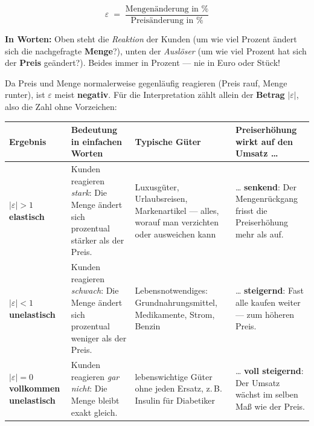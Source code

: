 \documentclass[11pt, a4paper]{article}
\begin{document}
\medskip
\noindent
\begin{minipage}[c]{0.55\textwidth}
\begin{formelbox}
\[
\varepsilon \;=\; \frac{\text{Mengenänderung in \%}}{\text{Preisänderung in \%}}
\]
\end{formelbox}
\end{minipage}\hfill
\begin{minipage}[c]{0.41\textwidth}
\small
\textbf{In Worten:} Oben steht die \emph{Reaktion} der Kunden (um wie viel Prozent
ändert sich die nachgefragte \textbf{Menge}?), unten der \emph{Auslöser} (um wie viel
Prozent hat sich der \textbf{Preis} geändert?). Beides immer in Prozent --- nie in
Euro oder Stück!
\end{minipage}
\medskip

Da Preis und Menge normalerweise gegenläufig reagieren (Preis rauf, Menge runter),
ist $\varepsilon$ meist \textbf{negativ}. Für die Interpretation zählt allein der
\textbf{Betrag} $|\varepsilon|$, also die Zahl ohne Vorzeichen:

\begin{center}
\small
\begin{tabular}{p{2.7cm} p{4.0cm} p{3.3cm} p{4.0cm}}
\toprule
\rowcolor{bfwTabHead}
\textbf{Ergebnis} & \textbf{Bedeutung in einfachen Worten} & \textbf{Typische Güter} & \textbf{Preiserhöhung wirkt auf den Umsatz \ldots}\\
\midrule
$|\varepsilon| > 1$ \newline \textbf{elastisch} &
  Kunden reagieren \emph{stark}: Die Menge ändert sich prozentual stärker als der Preis. &
  Luxusgüter, Urlaubsreisen, Markenartikel --- alles, worauf man verzichten oder ausweichen kann &
  \ldots{} \textbf{senkend}: Der Mengenrückgang frisst die Preiserhöhung mehr als auf.\\
\addlinespace
$|\varepsilon| < 1$ \newline \textbf{unelastisch} &
  Kunden reagieren \emph{schwach}: Die Menge ändert sich prozentual weniger als der Preis. &
  Lebensnotwendiges: Grundnahrungsmittel, Medikamente, Strom, Benzin &
  \ldots{} \textbf{steigernd}: Fast alle kaufen weiter --- zum höheren Preis.\\
\addlinespace
$|\varepsilon| = 0$ \newline \textbf{vollkommen unelastisch} &
  Kunden reagieren \emph{gar nicht}: Die Menge bleibt exakt gleich. &
  lebenswichtige Güter ohne jeden Ersatz, z.\,B. Insulin für Diabetiker &
  \ldots{} \textbf{voll steigernd}: Der Umsatz wächst im selben Maß wie der Preis.\\
\bottomrule
\end{tabular}
\end{center}
\end{document}

